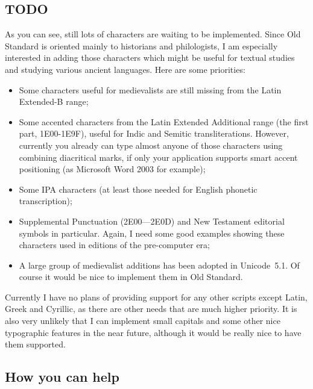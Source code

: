 \documentclass[12pt,a4paper,openany]{book}
\begin{document}
\subsection{TODO}

As you can see, still lots of characters are waiting to be implemented.
Since Old Standard is oriented mainly to historians and philologists, I am
especially interested in adding those characters which might be useful for
textual studies and studying various ancient languages. Here are some
priorities:

\begin{itemize}

\item Some characters useful for medievalists are still missing from the
Latin Extended-B range;

\item Some accented characters from the Latin Extended Additional range
(the first part, 1E00-1E9F), useful for Indic and Semitic transliterations.
However, currently you already can type almost anyone of those characters
using combining diacritical marks, if only your application supports smart
accent positioning (as Microsoft Word 2003 for example);

\item Some IPA characters (at least those needed for English phonetic
transcription);

\item Supplemental Punctuation (2E00—2E0D) and New Testament editorial
symbols in particular. Again, I need some good examples showing these
characters used in editions of the pre-computer era;

\item A large group of medievalist additions has been adopted in Unicode~5.1.
Of course it would be nice to implement them in Old Standard.

\end{itemize}

Currently I have no plans of providing support for any other scripts except
Latin, Greek and Cyrillic, as there are other needs that are much higher
priority. It is also very unlikely that I can implement small capitals and
some other nice typographic features in the near future, although it would
be really nice to have them supported.

\subsection{How you can help}
\end{document}
